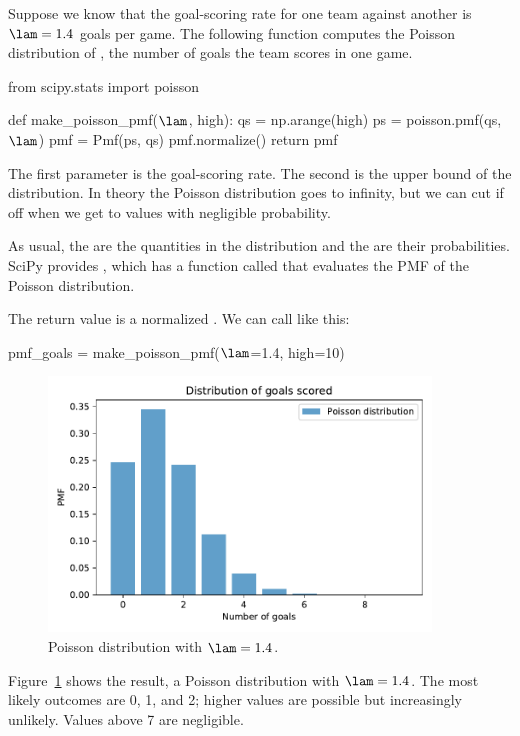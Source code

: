 \documentclass[12pt]{book}
\theoremstyle{exercise}
\begin{document}
Suppose we know that the goal-scoring rate for one team against another is $\lam = 1.4$ goals per game.
The following function computes the Poisson distribution of , the number of goals the team scores in one game.

\begin{code}
from scipy.stats import poisson

def make_poisson_pmf($\lam$, high):
    qs = np.arange(high)
    ps = poisson.pmf(qs, $\lam$)
    pmf = Pmf(ps, qs)
    pmf.normalize()
    return pmf
\end{code}

The first parameter is the goal-scoring rate.  
The second is the upper bound of the distribution.
In theory the Poisson distribution goes to infinity, but we can cut if off when we get to values with negligible probability.

As usual, the  are the quantities in the distribution and the  are their probabilities.
SciPy provides , which has a function called  that evaluates the PMF of the Poisson distribution.

The return value is a normalized .
We can call  like this:

\begin{code}
pmf_goals = make_poisson_pmf($\lam$=1.4, high=10)
\end{code}


\begin{figure}
\centerline{\includegraphics[width=4in]{figs/fig07-01.pdf}}
\caption{Poisson distribution with $\lam=1.4$.}
\label{fig07-01}
\end{figure}

Figure~\ref{fig07-01} shows the result, a Poisson distribution with $\lam=1.4$.
The most likely outcomes are 0, 1, and 2; higher values are possible but increasingly unlikely.
Values above 7 are negligible.
\end{document}
